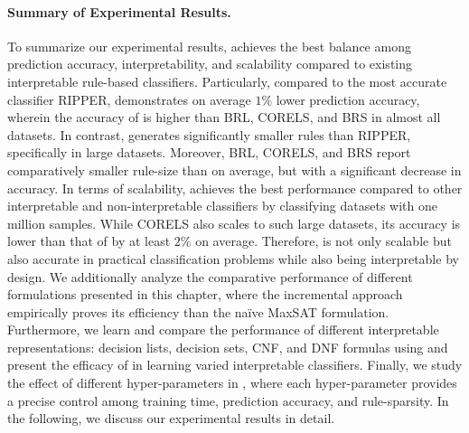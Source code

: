 \paragraph{Summary of Experimental Results.}
To summarize our experimental results, {\imli} achieves the best balance among prediction accuracy, interpretability, and scalability compared to existing interpretable rule-based classifiers. Particularly, compared to the most accurate classifier RIPPER, {\imli} demonstrates on average $ 1\% $ lower prediction accuracy, wherein the accuracy of {\imli} is higher than BRL, CORELS, and BRS in almost all datasets. In contrast, {\imli} generates significantly smaller rules than RIPPER, specifically in large datasets. Moreover, BRL, CORELS, and BRS report comparatively smaller rule-size than {\imli} on average, but with a significant decrease in accuracy.  In terms of scalability, {\imli} achieves the best performance compared to other interpretable and non-interpretable classifiers by classifying datasets with one million samples. While CORELS also scales to such large datasets,  its accuracy is lower than that of {\imli} by at least $ 2\% $ on average.  Therefore, {\imli} is not only scalable but also accurate in practical classification problems while also being interpretable by design.  We additionally analyze the comparative performance of different formulations presented in this chapter, where the  incremental approach empirically proves its efficiency than the na\"ive MaxSAT formulation.  Furthermore, we learn and compare the performance of different interpretable representations: decision lists, decision sets, CNF, and DNF formulas using {\imli} and present the efficacy of {\imli} in learning varied interpretable classifiers. Finally, we study the effect of different hyper-parameters in {\imli}, where each hyper-parameter provides a precise control among training time,  prediction accuracy, and rule-sparsity. In the following, we discuss our experimental results in detail. 




